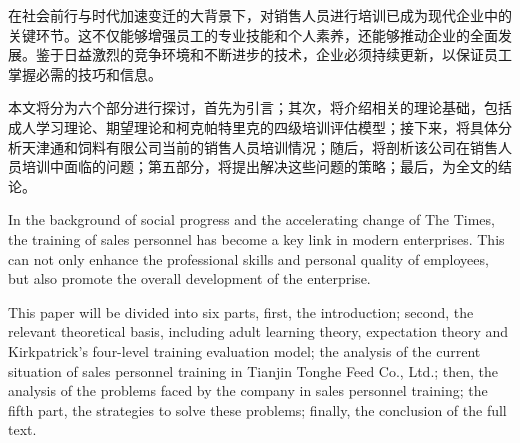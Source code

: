 \documentclass{main}
\begin{document}
\makecover

\begin{abstractzh}
在社会前行与时代加速变迁的大背景下，对销售人员进行培训已成为现代企业中的关键环节。这不仅能够增强员工的专业技能和个人素养，还能够推动企业的全面发展。鉴于日益激烈的竞争环境和不断进步的技术，企业必须持续更新，以保证员工掌握必需的技巧和信息。

本文将分为六个部分进行探讨，首先为引言；其次，将介绍相关的理论基础，包括成人学习理论、期望理论和柯克帕特里克的四级培训评估模型；接下来，将具体分析天津通和饲料有限公司当前的销售人员培训情况；随后，将剖析该公司在销售人员培训中面临的问题；第五部分，将提出解决这些问题的策略；最后，为全文的结论。

\end{abstractzh}

\begin{abstracten}
In the background of social progress and the accelerating change of The Times, the training of sales personnel has become a key link in modern enterprises. This can not only enhance the professional skills and personal quality of employees, but also promote the overall development of the enterprise.

This paper will be divided into six parts, first, the introduction; second, the relevant theoretical basis, including adult learning theory, expectation theory and Kirkpatrick's four-level training evaluation model; the analysis of the current situation of sales personnel training in Tianjin Tonghe Feed Co., Ltd.; then, the analysis of the problems faced by the company in sales personnel training; the fifth part, the strategies to solve these problems; finally, the conclusion of the full text.

\end{abstracten}

\clearpage
\thispagestyle{plain}
\tableofcontents
\end{document}
